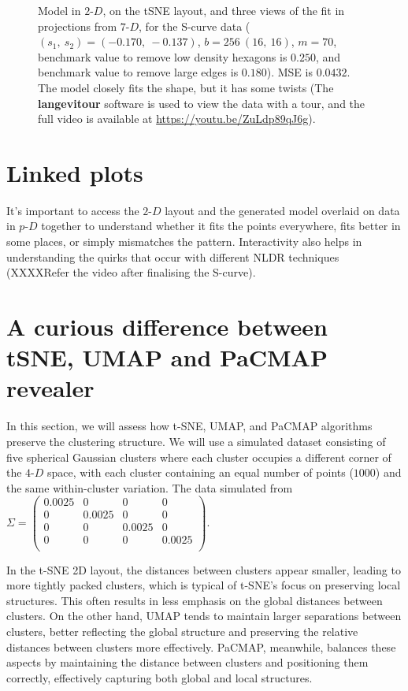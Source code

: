 \documentclass[
  12pt]{article}
\newcommand\pD{$p\text{-}D$}
\newcommand\gD{$2\text{-}D$}
\begin{document}
\begin{figure}[H]
\caption{\label{fig-scurve-sc-best}Model in \gD{}, on the tSNE layout,
and three views of the fit in projections from \(7\text{-}D\), for the
S-curve data (\((s_1, \ s_2) = (-0.170, \ -0.137)\),
\(b = 256 \  (16, \ 16)\), \(m = 70\), benchmark value to remove low
density hexagons is \(0.250\), and benchmark value to remove large edges
is \(0.180\)). MSE is \(0.0432\). The model closely fits the shape, but
it has some twists (The \textbf{langevitour} software is used to view
the data with a tour, and the full video is available at
\url{https://youtu.be/ZuLdp89qJ6g}).}

\end{figure}%

\section{Linked plots}\label{linked-plots}

It's important to access the \gD{} layout and the generated model
overlaid on data in \pD{} together to understand whether it fits the
points everywhere, fits better in some places, or simply mismatches the
pattern. Interactivity also helps in understanding the quirks that occur
with different NLDR techniques (XXXXRefer the video after finalising the
S-curve).

\section{A curious difference between tSNE, UMAP and PaCMAP
revealer}\label{a-curious-difference-between-tsne-umap-and-pacmap-revealer}

In this section, we will assess how t-SNE, UMAP, and PaCMAP algorithms
preserve the clustering structure. We will use a simulated dataset
consisting of five spherical Gaussian clusters where each cluster
occupies a different corner of the \(4\text{-}D\) space, with each
cluster containing an equal number of points (\(1000\)) and the same
within-cluster variation. The data simulated from
\(\Sigma = \begin{pmatrix}
0.0025 & 0 & 0 & 0 \\
0 & 0.0025 & 0 & 0 \\
0 & 0 & 0.0025 & 0 \\
0 & 0 & 0 & 0.0025 \\
\end{pmatrix}\).

In the t-SNE 2D layout, the distances between clusters appear smaller,
leading to more tightly packed clusters, which is typical of t-SNE's
focus on preserving local structures. This often results in less
emphasis on the global distances between clusters. On the other hand,
UMAP tends to maintain larger separations between clusters, better
reflecting the global structure and preserving the relative distances
between clusters more effectively. PaCMAP, meanwhile, balances these
aspects by maintaining the distance between clusters and positioning
them correctly, effectively capturing both global and local structures.
\end{document}
